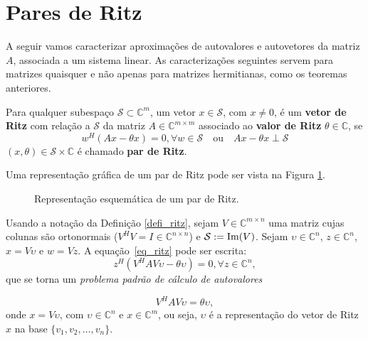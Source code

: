 \section{Pares de Ritz}\label{sec_parritz}

 A seguir vamos caracterizar aproximaç\~{o}es de autovalores e autovetores da matriz $A$, associada a um sistema linear. As caracterizaç\~{o}es seguintes servem para matrizes quaisquer e não apenas para matrizes hermitianas, como os teoremas anteriores.
\begin{defi}\label{defi_ritz}
Para qualquer subespaço $\mathcal{S}\subset \mathbb{C}^m$, um vetor $x \in \mathcal{S}$, com $x\ne 0$, é um \textbf{vetor de Ritz} com relação a $\mathcal{S}$ da
matriz $A\in \mathbb{C}^{m\times m} $ associado ao \textbf{valor de Ritz} $\theta\in \mathbb{C}$,  se
\begin{equation}\label{eq_ritz}
   w^H(Ax - \theta x) = 0, \forall w \in \mathcal{S} \quad\text{ou}\quad Ax - \theta x\perp \mathcal{S}
\end{equation}
  $(x,\theta)\in \mathcal{S}\times \mathbb{C}$ é chamado \textbf{par de Ritz}.
\end{defi}
Uma representação gráfica de um par de Ritz pode ser vista na Figura \ref{fig_ritzpair}. %

\begin{figure}[htb]
  \caption{Representação esquemática de um par de Ritz.}\label{fig_ritzpair}
\end{figure}

\begin{obs}\label{obs_ritzpair}
Usando a notação da Definição \ref{defi_ritz}, sejam $V\in \mathbb{C}^{m\times n}$  uma matriz cujas colunas são ortonormais ($V^HV=I\in \mathbb{C}^{n\times n}$) e  $\mathcal{S}:=\operatorname{Im}(V)$.
 Sejam $\upsilon\in \mathbb{C}^{n}$, $z\in \mathbb{C}^{n}$, $x = V\upsilon$ e $w = Vz$. A equação~\eqref{eq_ritz}
pode ser escrita:
\begin{equation}\label{eq_ritzrepre}
z^H (V^HAV\upsilon - \theta \upsilon) = 0, \forall z\in \mathbb{C}^{n},
\end{equation}
\noindent que se torna um \emph{problema padrão de cálculo de autovalores}

 \begin{equation}\label{eq_rayleighritzritz}
V^HAV\upsilon = \theta\upsilon,
\end{equation}
onde  $x=V\upsilon$, com $\upsilon\in\mathbb{C}^{n}$ e $x\in\mathbb{C}^{m}$, ou seja, $\upsilon$ é  a
representação do vetor de Ritz $x$ na base $\{v_1,v_2,\ldots,v_n\}$.
\end{obs}

